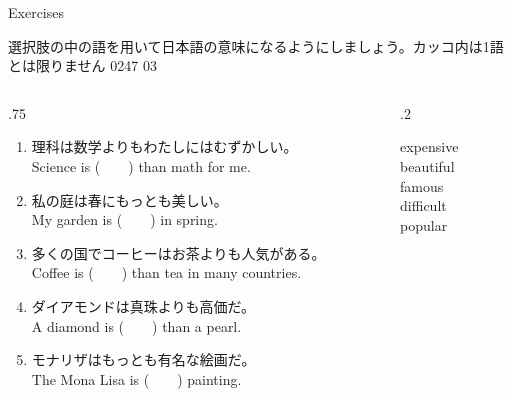 \documentclass[aspectratio=169,xcolor={dvipsnames,table}]{beamer}
\begin{document}
\begin{frame}[plain]{Exercises}

{\small 選択肢の中の語を用いて日本語の意味になるようにしましょう。カッコ内は1語とは限りません}%
\hfill{\tiny 0247}\,{\scriptsize {}\,03}
\begin{columns}[t]
 \begin{column}{.75\textwidth}
   \begin{enumerate}
  \item 理科は数学よりもわたしにはむずかしい。\\
	Science is (~~~~) than math for me.
  \item 私の庭は春にもっとも美しい。\\
	My garden is (~~~~) in spring.
  \item 多くの国でコーヒーはお茶よりも人気がある。\\
	Coffee is (~~~~) than tea in many countries.
  \item ダイアモンドは真珠よりも高価だ。\\
	A diamond is (~~~~) than a pearl.
  \item モナリザはもっとも有名な絵画だ。\\
	The Mona Lisa is (~~~~) painting.
 \end{enumerate}
 \end{column}
\begin{column}{.2\textwidth}
\begin{tcolorbox}
 expensive\\
beautiful\\
famous\\
difficult\\
popular
\end{tcolorbox}
\end{column}
\end{columns}
\end{frame}
\end{document}
